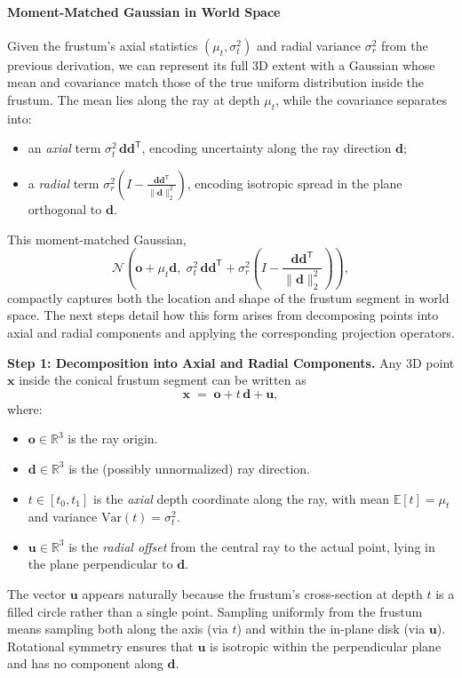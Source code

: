 \begin{enrichment}
\begin{enrichment}
    \paragraph{Moment-Matched Gaussian in World Space}
    Given the frustum’s axial statistics \((\mu_t, \sigma_t^2)\) and radial variance \(\sigma_r^2\) from the previous derivation, we can represent its full 3D extent with a Gaussian whose mean and covariance match those of the true uniform distribution inside the frustum.  
    The mean lies along the ray at depth \(\mu_t\), while the covariance separates into:
    \begin{itemize}
        \item an \emph{axial} term \(\sigma_t^2\,\mathbf{d}\mathbf{d}^\mathsf{T}\), encoding uncertainty along the ray direction \(\mathbf{d}\);
        \item a \emph{radial} term \(\sigma_r^2\!\left(I - \frac{\mathbf{d}\mathbf{d}^\mathsf{T}}{\|\mathbf{d}\|_2^2}\right)\), encoding isotropic spread in the plane orthogonal to \(\mathbf{d}\).
    \end{itemize}
    This moment-matched Gaussian,
    \[
    \mathcal{N}\!\left(
    \mathbf{o} + \mu_t \mathbf{d},\;
    \sigma_t^2\,\mathbf{d}\mathbf{d}^\mathsf{T}
    + \sigma_r^2\!\left(I - \frac{\mathbf{d}\mathbf{d}^\mathsf{T}}{\|\mathbf{d}\|_2^2}\right)
    \right),
    \]
    compactly captures both the location and shape of the frustum segment in world space.  
    The next steps detail how this form arises from decomposing points into axial and radial components and applying the corresponding projection operators.
    
    \medskip
    \noindent\textbf{Step 1: Decomposition into Axial and Radial Components.}
    Any 3D point \(\mathbf{x}\) inside the conical frustum segment can be written as
    \[
    \mathbf{x} \;=\; \mathbf{o} + t\,\mathbf{d} + \mathbf{u},
    \]
    where:
    \begin{itemize}
        \item \(\mathbf{o} \in \mathbb{R}^3\) is the ray origin.
        \item \(\mathbf{d} \in \mathbb{R}^3\) is the (possibly unnormalized) ray direction.
        \item \(t \in [t_0, t_1]\) is the \emph{axial} depth coordinate along the ray, with mean \(\mathbb{E}[t] = \mu_t\) and variance \(\mathrm{Var}(t) = \sigma_t^2\).
        \item \(\mathbf{u} \in \mathbb{R}^3\) is the \emph{radial offset} from the central ray to the actual point, lying in the plane perpendicular to \(\mathbf{d}\).
    \end{itemize}
    The vector \(\mathbf{u}\) appears naturally because the frustum’s cross-section at depth \(t\) is a filled circle rather than a single point. Sampling uniformly from the frustum means sampling both along the axis (via \(t\)) and within the in-plane disk (via \(\mathbf{u}\)). Rotational symmetry ensures that \(\mathbf{u}\) is isotropic within the perpendicular plane and has no component along \(\mathbf{d}\).
    

\end{enrichment}
\end{enrichment}
